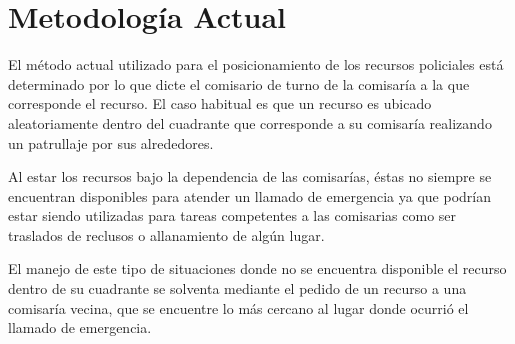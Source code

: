 \section{Metodología Actual}
El método actual utilizado para el posicionamiento de los recursos policiales está determinado por lo que dicte el comisario de turno de la comisaría a la que corresponde el recurso. El caso habitual es que un recurso es ubicado aleatoriamente dentro del cuadrante que corresponde a su comisaría realizando un patrullaje por sus alrededores.

Al estar los recursos bajo la dependencia de las comisarías, éstas no siempre se encuentran disponibles para atender un llamado de emergencia ya que podrían estar siendo utilizadas para tareas competentes a las comisarias como ser traslados de reclusos o allanamiento de algún lugar.

El manejo de este tipo de situaciones donde no se encuentra disponible el recurso dentro de su cuadrante se solventa mediante el pedido de un recurso a una comisaría vecina, que se encuentre lo más cercano al lugar donde ocurrió el llamado de emergencia.